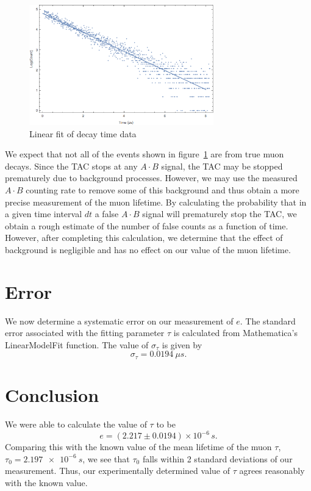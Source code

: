 \documentclass[aps, reprint,amsmath,amssymb]{revtex4-1} %
\begin{document}
\begin{figure}
\centering
\includegraphics[width=8cm]{linearfit.png}
\caption{Linear fit of decay time data}
\label{fig:fit}
\end{figure}

We expect that not all of the events shown in figure~\ref{fig:fit} are from true muon decays. Since the TAC stops at any $A \cdot B$ signal, the TAC may be stopped prematurely due to background processes. However, we may use the measured $A \cdot B$ counting rate to remove some of this background and thus obtain a more precise measurement of the muon lifetime. By calculating the probability that in a given time interval $dt$ a false $A \cdot B$ signal will prematurely stop the TAC, we obtain a rough estimate of the number of false counts as a function of time. However, after completing this calculation, we determine that the effect of background is negligible and has no effect on our value of the muon lifetime. 

\section{Error}
We now determine a systematic error on our measurement of $e$. The standard error associated with the fitting parameter $\tau$ is calculated from Mathematica's LinearModelFit function. The value of $\sigma_{\tau}$ is given by
\[
	\sigma_{\tau} = \SI{0.0194}{\mu s}.
\]

\section{Conclusion}

We were able to calculate the value of $\tau$ to be
\[
    e = (2.217 \pm 0.0194) \times 10^{-6} \,\si{s}.
\]
Comparing this with the known value of the mean lifetime of the muon $\tau$, $\tau_0 = \SI{2.197e-6}{s}$, we see that $\tau_0$ falls within 2 standard deviations of our measurement.
Thus, our experimentally determined value of $\tau$ agrees reasonably with the
known value.
\end{document}
